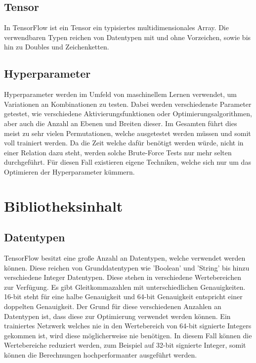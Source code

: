 \subsection{Tensor}

In TensorFlow ist ein Tensor ein typisiertes multidimensionales Array. 
Die verwendbaren Typen reichen von Datentypen mit und ohne Vorzeichen, sowie bis hin zu Doubles und Zeichenketten. \cite{wp2015tensorflow} 

\subsection{Hyperparameter} 

Hyperparameter werden im Umfeld von maschinellem Lernen verwendet, um Variationen an Kombinationen zu testen. 
Dabei werden verschiedenste Parameter getestet, wie verschiedene Aktivierungsfunktionen oder Optimierungsalgorithmen, aber auch die Anzahl an Ebenen und Breiten dieser. 
Im Gesamten führt dies meist zu sehr vielen Permutationen, welche ausgetestet werden müssen und somit voll trainiert werden. 
Da die Zeit welche dafür benötigt werden würde, nicht in einer Relation dazu steht, werden solche Brute-Force Tests nur mehr selten durchgeführt. 
Für diesen Fall existieren eigene Techniken, welche sich nur um das Optimieren der Hyperparameter kümmern. \cite{bishop2006pattern}

\section{Bibliotheksinhalt}

\subsection{Datentypen}

TensorFlow besitzt eine große Anzahl an Datentypen, welche verwendet werden können. 
Diese reichen von Grunddatentypen wie 'Boolean' und 'String' bis hinzu verschiedene Integer Datentypen. 
Diese stehen in verschiedene Wertebereichen zur Verfügung. 
Es gibt Gleitkommazahlen mit unterschiedlichen Genauigkeiten. 16-bit steht für eine halbe Genauigkeit und 64-bit Genauigkeit entspricht einer doppelten Genauigkeit.
Der Grund für diese verschiedenen Anzahlen an Datentypen ist, dass diese zur Optimierung verwendet werden können. 
Ein trainiertes Netzwerk welches nie in den Wertebereich von 64-bit signierte Integers gekommen ist, wird diese möglicherweise nie benötigen. 
In diesem Fall können die Wertebereiche reduziert werden, zum Beispiel auf 32-bit signierte Integer, somit können die Berechnungen hochperformanter ausgeführt werden. \cite{TensorFlow}

